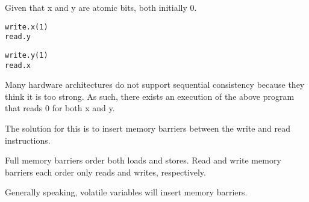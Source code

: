 \documentclass{idc_msc}
\begin{document}
Given that x and y are atomic bits, both initially 0.

\noindent\begin{minipage}{.45\textwidth}
\begin{lstlisting}[frame=L,mathescape=true,title=Process A]
write.x(1)
read.y
\end{lstlisting}
\end{minipage}\hfill
\begin{minipage}{.45\textwidth}
\begin{lstlisting}[frame=L,mathescape=true,title=Process B]
write.y(1)
read.x
\end{lstlisting}
\end{minipage}

Many hardware architectures do not support sequential consistency because they think it is too strong.
As such, there exists an execution of the above program that reads 0 for both x and y.

The solution for this is to insert memory barriers between the write and read instructions.

Full memory barriers order both loads and stores. Read and write memory barriers each order only reads and writes, respectively.

Generally speaking, volatile variables will insert memory barriers.
\end{document}
